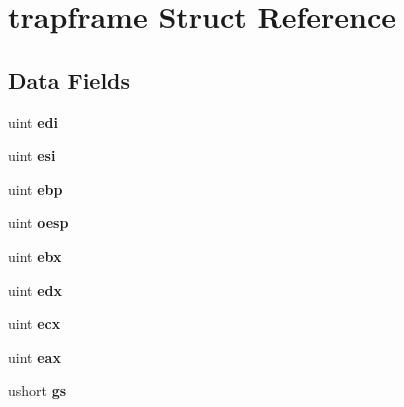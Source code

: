 \hypertarget{structtrapframe}{}\section{trapframe Struct Reference}
\label{structtrapframe}
\subsection*{Data Fields}
\begin{DoxyCompactItemize}
\item 
uint {\bfseries edi}\hypertarget{structtrapframe_ad20959553b558987a0d475b6367c87d0}{}\label{structtrapframe_ad20959553b558987a0d475b6367c87d0}

\item 
uint {\bfseries esi}\hypertarget{structtrapframe_a11cbc20a968f2ce7a9b71590a709bb46}{}\label{structtrapframe_a11cbc20a968f2ce7a9b71590a709bb46}

\item 
uint {\bfseries ebp}\hypertarget{structtrapframe_a258f414f983f95f6799372d548fbd6d3}{}\label{structtrapframe_a258f414f983f95f6799372d548fbd6d3}

\item 
uint {\bfseries oesp}\hypertarget{structtrapframe_a8466e7bcbbbe2d19fbe7f4fe0daa29fb}{}\label{structtrapframe_a8466e7bcbbbe2d19fbe7f4fe0daa29fb}

\item 
uint {\bfseries ebx}\hypertarget{structtrapframe_a0f93026966ea52a69a94870fb394ba04}{}\label{structtrapframe_a0f93026966ea52a69a94870fb394ba04}

\item 
uint {\bfseries edx}\hypertarget{structtrapframe_a62585fbda8434a03de564611b89c02ad}{}\label{structtrapframe_a62585fbda8434a03de564611b89c02ad}

\item 
uint {\bfseries ecx}\hypertarget{structtrapframe_ad42fe2bbc83c7fe778f0127ac038efa3}{}\label{structtrapframe_ad42fe2bbc83c7fe778f0127ac038efa3}

\item 
uint {\bfseries eax}\hypertarget{structtrapframe_ab1dd3a10936b61129d7395c3a21bc2fe}{}\label{structtrapframe_ab1dd3a10936b61129d7395c3a21bc2fe}

\item 
ushort {\bfseries gs}\hypertarget{structtrapframe_a3df62e3ed00405cbaaa4d72902c617da}{}\label{structtrapframe_a3df62e3ed00405cbaaa4d72902c617da}


\end{DoxyCompactItemize}
